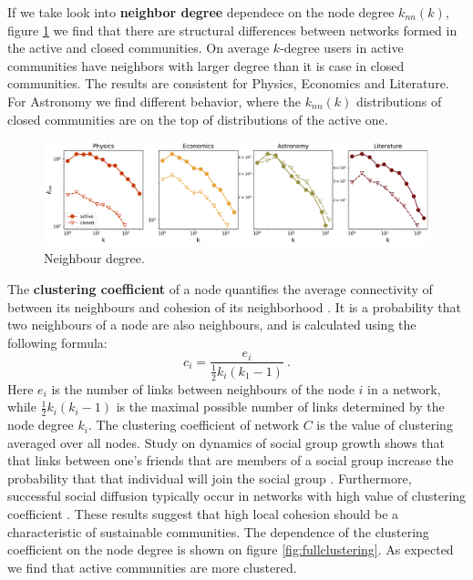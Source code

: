 If we take look into \textbf{neighbor degree} dependece on the node degree $k_{nn}(k)$, figure \ref{fig:fullneighdeg} we find that there are structural differences between networks formed in the active and closed communities. On average $k$-degree users in active communities have neighbors with larger degree than it is case in closed communities. The results are consistent for Physics, Economics and Literature. For Astronomy we find different behavior, where the $k_{nn}(k)$ distributions of closed communities are on the top of distributions of the active one. 

\begin{figure}[h]
	\centering
	\includegraphics[width=\linewidth]{figures/stackexchange/neighdeg_fullnet.pdf}
	\caption{Neighbour degree.}
	\label{fig:fullneighdeg}
\end{figure}

The \textbf{clustering coefficient} of a node quantifies the average connectivity of between its neighbours and cohesion of its neighborhood \cite{boccaletti2006complex}. It is a probability that two neighbours of a node are also neighbours, and is calculated using the following formula:
\begin{equation}
c_{i}=\frac{e_{i}}{\frac{1}{2}k_{i}(k_{1}-1)} \ .
\label{eq:clust}
\end{equation}
Here $e_{i}$ is the number of links between neighbours of the node $i$ in a network, while $\frac{1}{2}k_{i}(k_{i}-1)$ is the maximal possible number of links determined by the node degree $k_{i}$. The clustering coefficient of network $C$ is the value of clustering averaged over all nodes. Study on dynamics of social group growth shows that that links between one's friends that are members of a social group increase the probability that that individual will join the social group \cite{backstrom2006group}. Furthermore, successful social diffusion  typically occur in networks with high value of clustering coefficient \cite{centola2007cascade}. These results suggest that high local cohesion should be a characteristic of sustainable communities. The dependence of the clustering coefficient on the node degree is shown on figure \ref{fig:fullclustering}. As expected we find that active communities are more clustered.

